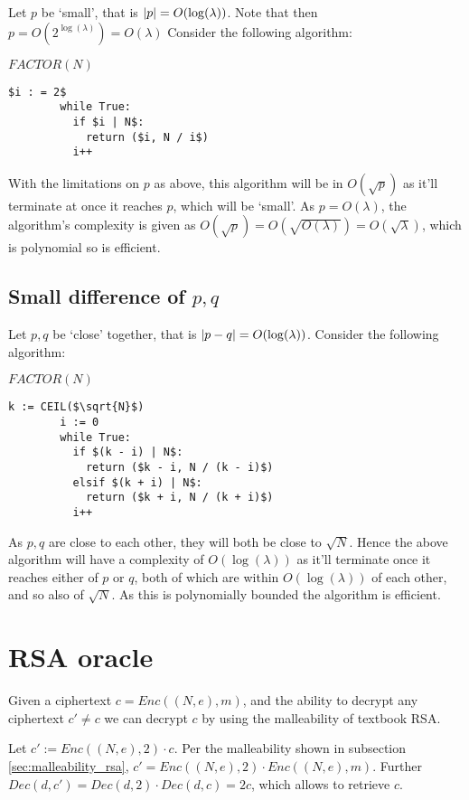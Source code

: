 \documentclass[a4paper]{scrreprt}
\DeclarePairedDelimiter\abs{\lvert}{\rvert}
\begin{document}
Let $p$ be `small', that is $\abs{p} = O(\log(\lambda))$. Note that then $p =
O(2^{\log(\lambda)}) = O(\lambda)$ Consider the following algorithm:

\begin{library}{$FACTOR(N)$}
	\begin{lstlisting}[mathescape=true,autogobble=true]
		$i : = 2$
		while True:
		  if $i | N$:
		    return ($i, N / i$)
		  i++
	\end{lstlisting}
\end{library}

With the limitations on $p$ as above, this algorithm will be in $O(\sqrt{p})$
as it'll terminate at once it reaches $p$, which will be `small'. As $p =
O(\lambda)$, the algorithm's complexity is given as $O(\sqrt{p}) =
O(\sqrt{O(\lambda)}) = O(\sqrt{\lambda})$, which is polynomial so is efficient.

\subsection{Small difference of $p, q$}

Let $p, q$ be `close' together, that is $\abs{p - q} = O(\log(\lambda))$.
Consider the following algorithm:

\begin{library}{$FACTOR(N)$}
	\begin{lstlisting}[mathescape=true,autogobble=true]
		k := CEIL($\sqrt{N}$)
		i := 0
		while True:
		  if $(k - i) | N$:
		    return ($k - i, N / (k - i)$)
		  elsif $(k + i) | N$:
		    return ($k + i, N / (k + i)$)
		  i++
	\end{lstlisting}
\end{library}

As $p, q$ are close to each other, they will both be close to $\sqrt{N}$. Hence
the above algorithm will have a complexity of $O(\log(\lambda))$ as it'll
terminate once it reaches either of $p$ or $q$, both of which are within
$O(\log(\lambda))$ of each other, and so also of $\sqrt{N}$. As this is
polynomially bounded the algorithm is efficient.

\section{RSA oracle}

Given a ciphertext $c = Enc((N, e), m)$, and the ability to decrypt any
ciphertext $c' \neq c$ we can decrypt $c$ by using the malleability of textbook
RSA. 

Let $c' := Enc((N, e), 2) \cdot c$. Per the malleability shown in subsection
\ref{sec:malleability_rsa}, $c' = Enc((N, e), 2) \cdot Enc((N, e), m)$. Further
$Dec(d, c') = Dec(d, 2) \cdot Dec(d, c) = 2c$, which allows to retrieve $c$.
\end{document}
